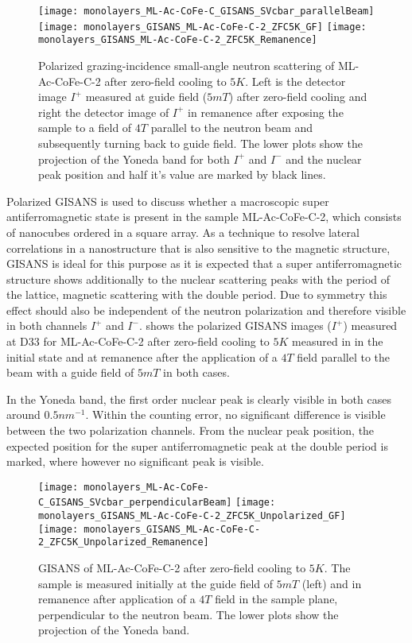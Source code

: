 \documentclass[\main/dresen_thesis.tex]{subfiles}
\begin{document}
  \begin{figure}[tb]
    \centering
    \texttt{[image: monolayers\_ML-Ac-CoFe-C\_GISANS\_SVcbar\_parallelBeam]}
    \texttt{[image: monolayers\_GISANS\_ML-Ac-CoFe-C-2\_ZFC5K\_GF]}
    \texttt{[image: monolayers\_GISANS\_ML-Ac-CoFe-C-2\_ZFC5K\_Remanence]}
    \caption{\label{fig:monolayer:magneticStructure:polGisans5KZFC}Polarized grazing-incidence small-angle neutron scattering of ML-Ac-CoFe-C-2 after zero-field cooling to $5 \unit{K}$. Left is the detector image $I^{+}$ measured at guide field ($5 \unit{mT}$) after zero-field cooling and right the detector image of $I^{+}$ in remanence after exposing the sample to a field of $4 \unit{T}$ parallel to the neutron beam and subsequently turning back to guide field. The lower plots show the projection of the Yoneda band for both $I^{+}$ and $I^{-}$ and the nuclear peak position and half it's value are marked by black lines.}
  \end{figure}
  Polarized GISANS is used to discuss whether a macroscopic super antiferromagnetic state is present in the sample ML-Ac-CoFe-C-2, which consists of nanocubes ordered in a square array.
  As a technique to resolve lateral correlations in a nanostructure that is also sensitive to the magnetic structure, GISANS is ideal for this purpose as it is expected that a super antiferromagnetic structure shows additionally to the nuclear scattering peaks with the period of the lattice, magnetic scattering with the double period.
  Due to symmetry this effect should also be independent of the neutron polarization and therefore visible in both channels $I^{+}$ and $I^{-}$.
   shows the polarized GISANS images ($I^{+}$) measured at D33 for ML-Ac-CoFe-C-2 after zero-field cooling to $5 \unit{K}$ measured in in the initial state and at remanence after the application of a $4 \unit{T}$ field parallel to the beam with a guide field of $5 \unit{mT}$ in both cases.

  In the Yoneda band, the first order nuclear peak is clearly visible in both cases around $0.5 \unit{nm^{-1}}$.
  Within the counting error, no significant difference is visible between the two polarization channels.
  From the nuclear peak position, the expected position for the super antiferromagnetic peak at the double period is marked, where however no significant peak is visible.

  \begin{figure}[tb]
    \centering
    \texttt{[image: monolayers\_ML-Ac-CoFe-C\_GISANS\_SVcbar\_perpendicularBeam]}
    \texttt{[image: monolayers\_GISANS\_ML-Ac-CoFe-C-2\_ZFC5K\_Unpolarized\_GF]}
    \texttt{[image: monolayers\_GISANS\_ML-Ac-CoFe-C-2\_ZFC5K\_Unpolarized\_Remanence]}
    \caption{\label{fig:monolayer:magneticStructure:Gisans5KZFCperpendicular}GISANS of ML-Ac-CoFe-C-2 after zero-field cooling to $5 \unit{K}$. The sample is measured initially at the guide field of $5 \unit{mT}$ (left) and in remanence after application of a $4 \unit{T}$ field in the sample plane, perpendicular to the neutron beam. The lower plots show the projection of the Yoneda band.}
  \end{figure}
\end{document}

